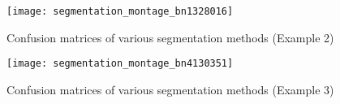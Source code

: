 \begin{figure}[p]
	\texttt{[image: segmentation\_montage\_bn1328016]}
	\caption{Confusion matrices of various segmentation methods (Example 2)}
	\label{fig:seg-montage-ex2}
\end{figure}

\begin{figure}[p]
	\texttt{[image: segmentation\_montage\_bn4130351]}
	\caption{Confusion matrices of various segmentation methods (Example 3)}
	\label{fig:seg-montage-ex3}
\end{figure}


